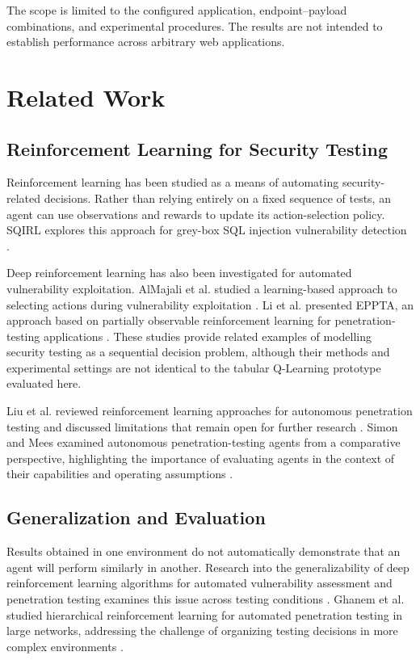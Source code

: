 \documentclass[conference]{IEEEtran}
\begin{document}
The scope is limited to the configured application,
endpoint--payload combinations, and experimental procedures.
The results are not intended to establish performance
across arbitrary web applications.

\section{Related Work}

\subsection{Reinforcement Learning for Security Testing}

Reinforcement learning has been studied as a means of
automating security-related decisions. Rather than relying
entirely on a fixed sequence of tests, an agent can use
observations and rewards to update its action-selection
policy. SQIRL explores this approach for grey-box SQL
injection vulnerability detection \cite{sqirl2023}.

Deep reinforcement learning has also been investigated
for automated vulnerability exploitation. AlMajali
et al. studied a learning-based approach to selecting
actions during vulnerability exploitation \cite{almajali2024}.
Li et al. presented EPPTA, an approach based on partially
observable reinforcement learning for penetration-testing
applications \cite{li2025}. These studies provide related
examples of modelling security testing as a sequential
decision problem, although their methods and experimental
settings are not identical to the tabular Q-Learning
prototype evaluated here.

Liu et al. reviewed reinforcement learning approaches
for autonomous penetration testing and discussed
limitations that remain open for further research
\cite{rlreview2026}. Simon and Mees examined autonomous
penetration-testing agents from a comparative perspective,
highlighting the importance of evaluating agents in the
context of their capabilities and operating assumptions
\cite{sok2024}.

\subsection{Generalization and Evaluation}

Results obtained in one environment do not automatically
demonstrate that an agent will perform similarly in another.
Research into the generalizability of deep reinforcement
learning algorithms for automated vulnerability assessment
and penetration testing examines this issue across testing
conditions \cite{generalization2024}. Ghanem et al. studied
hierarchical reinforcement learning for automated
penetration testing in large networks, addressing the
challenge of organizing testing decisions in more complex
environments \cite{ghanem2023}.
\end{document}
